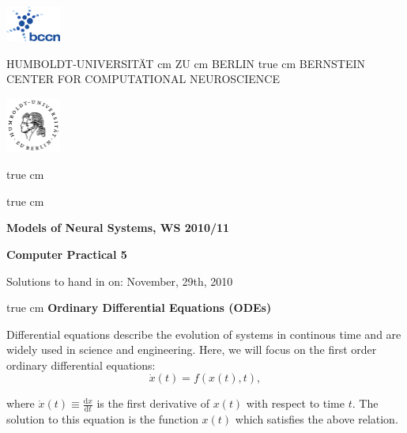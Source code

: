\documentclass[12pt, a4]{article}
\begin{document}
\parbox{2cm}{
\includegraphics[width=1.8cm]{bccnlogo.pdf}
}
\parbox{11cm}{
\begin{center}
\large HUMBOLDT-UNIVERSIT\"AT  cm ZU  cm BERLIN
 true cm
\mgross BERNSTEIN CENTER FOR COMPUTATIONAL NEUROSCIENCE
\end{center}
}
\parbox{2cm}
{
\hfill
\includegraphics[width=1.8cm]{hublogo.pdf}
}

 true cm



 true cm
\centerline{\bf Models of Neural Systems, WS 2010/11}
\centerline{\bf Computer Practical 5}
\centerline{Solutions to hand in on: November, 29th, 2010}

 true cm
{\bf Ordinary Differential Equations (ODEs)}

\medskip
Differential equations describe the evolution of systems in continous
time and are widely used in science and engineering. Here, we will
focus on the first order ordinary differential equations:
\begin{equation}
    \dot{x}(t) = f\left(x(t),t\right),
    \label{eq:ODE}
\end{equation} 

where $\dot{x}(t)\equiv\frac{\mathrm{d}x}{\mathrm{d}t}$ is the first derivative of
$x(t)$ with respect to time $t$. The solution to this equation
is the function $x(t)$ which satisfies the above relation.
\end{document}
